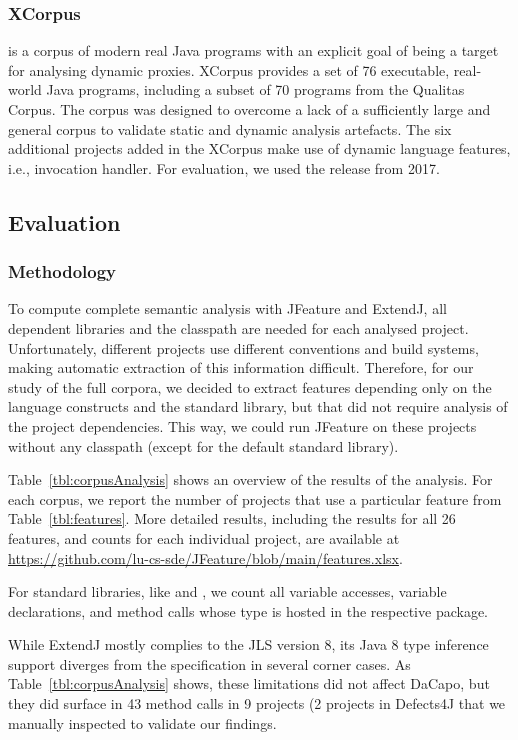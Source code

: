 \subsubsection*{\textbf{XCorpus}}
is a corpus of modern real Java programs with an explicit goal of being a target for analysing dynamic proxies. XCorpus provides a set of 76 executable, real-world Java programs, including a subset of 70 programs from the Qualitas Corpus. The corpus was designed
to overcome a lack of a sufficiently large and general corpus to validate static and dynamic analysis artefacts. The six additional projects added in the XCorpus make use of dynamic language features, i.e., invocation handler.
For evaluation, we used the release from 2017.



\subsection{Evaluation}

\subsubsection*{\textbf{Methodology}}
To compute complete semantic analysis with JFeature and ExtendJ, all dependent libraries and the classpath are needed for each analysed project. Unfortunately, different projects use different conventions and build systems, making automatic extraction of this information difficult.
Therefore, for our study of the full corpora, we decided to extract features depending only on the language constructs and the standard library, but that did not require analysis of the project dependencies. This way, we could run JFeature on these projects without any classpath (except for the default standard library).

Table~\ref{tbl:corpusAnalysis} shows an overview of the results of the analysis. For each corpus, we report the number of projects that use a particular feature from Table~\ref{tbl:features}. More detailed results, including the results for all 26 features, and counts for each individual project, are available at \url{https://github.com/lu-cs-sde/JFeature/blob/main/features.xlsx}.

For standard libraries, like  and , we count all variable accesses, variable declarations, and method calls whose type is hosted in the respective package.

While ExtendJ mostly complies to the JLS version 8, its Java 8 type inference support diverges from the specification in several corner cases.
As Table~\ref{tbl:corpusAnalysis} shows, these limitations did not affect DaCapo, but they did surface in 43 method calls in 9 projects (2 projects in Defects4J that we manually inspected to validate our findings.

